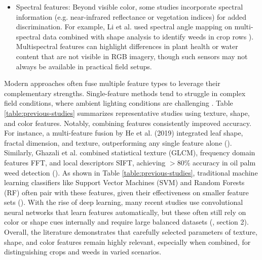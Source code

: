 \documentclass[letterpaper]{report}
\begin{document}
\begin{itemize}
	\item{Spectral features: Beyond visible color, some studies incorporate spectral information (e.g. near-infrared reflectance or vegetation indices) for added discrimination. For example, Li et al. used spectral angle mapping on multi-spectral data combined with shape analysis to identify weeds in crop rows \parencite{Wu2021-gt}). Multispectral features can highlight differences in plant health or water content that are not visible in RGB imagery, though such sensors may not always be available in practical field setups. }
\end{itemize} 

Modern approaches often fuse multiple feature types to leverage their complementary strengths. Single-feature methods tend to struggle in complex field conditions, where ambient lighting conditions are challenging \parencite{Wu2021-gt}. Table \ref{table:previous-studies} summarizes representative studies using texture, shape, and color features. Notably, combining features consistently improved accuracy. For instance, a multi-feature fusion by He et al. (2019) integrated leaf shape, fractal dimension, and texture, outperforming any single feature alone (\cite{Wu2021-gt}). Similarly, Ghazali et al. combined statistical texture (GLCM), frequency domain features \gls{FFT}, and local descriptors \gls{SIFT}, achieving $>$80\% accuracy in oil palm weed detection (\cite{Wu2021-gt}). As shown in Table \ref{table:previous-studies}, traditional machine learning classifiers like Support Vector Machines (SVM) and Random Forests (RF) often pair with these features, given their effectiveness on smaller feature sets (\cite{Wu2021-gt}). With the rise of deep learning, many recent studies use convolutional neural networks that learn features automatically, but these often still rely on color or shape cues internally and require large balanced datasets  (\cite{Wu2021-gt}, section 2). Overall, the literature demonstrates that carefully selected parameters of texture, shape, and color features remain highly relevant, especially when combined, for distinguishing crops and weeds in varied scenarios.
\end{document}
